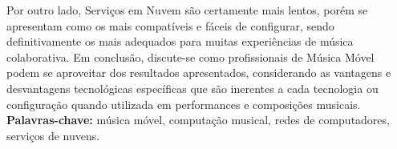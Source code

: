 \documentclass[11pt,twoside,a4paper]{book}
\begin{document}
	Por outro lado, Serviços em Nuvem são certamente mais lentos, porém se apresentam como os mais compatíveis e fáceis de configurar, sendo definitivamente os mais adequados para muitas experiências de música colaborativa.
	Em conclusão, discute-se como profissionais de Música Móvel podem se aproveitar dos resultados apresentados, considerando as vantagens e desvantagens tecnológicas específicas que são inerentes a cada tecnologia ou configuração quando utilizada em performances e composições musicais.
	\\
	
	\noindent \textbf{Palavras-chave:} música móvel, computação musical, redes de computadores, serviços de nuvens.
	
	\tableofcontents    %
	
\end{document}
